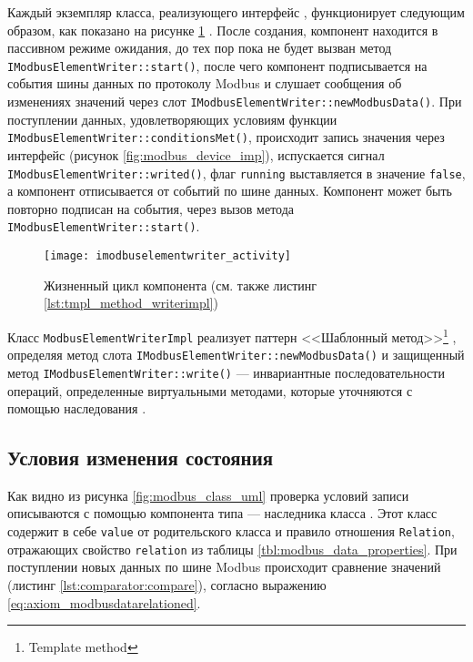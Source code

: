 Каждый экземпляр класса, реализующего интерфейс \mbwriter,
функционирует следующим образом, как показано на рисунке \ref{fig:imodbuselementwriter_activity} \cite[стр. 217]{book:oop:oop_analize}.
После создания, компонент находится в пассивном режиме ожидания, до тех пор пока не будет вызван
метод \texttt{IModbusElementWriter::start()}, после чего компонент подписывается на события шины данных по протоколу Modbus
и слушает сообщения об изменениях значений через слот \texttt{IModbusElementWriter::newModbusData()}.
При поступлении данных, удовлетворяющих условиям функции \texttt{IModbusElementWri\-ter::con\-di\-tions\-Met()},
происходит запись значения через интерфейс \mbdevice (рисунок \ref{fig:modbus_device_imp}),
испускается сигнал \texttt{IModbus\-Ele\-ment\-Writer::writed()},
флаг \texttt{running} выставляется в значение \texttt{false},
а компонент отписывается от событий по шине данных.
Компонент может быть повторно подписан на события, через вызов метода \texttt{IModbusElementWriter::start()}.

\begin{center}
    \begin{figure}
        \texttt{[image: imodbuselementwriter\_activity]}
        \caption[Жизненный цикл компонента \mbwriter]%
            {Жизненный цикл компонента \mbwriter%
                (см. также листинг \ref{lst:tmpl_method_writerimpl})%
            }%
            \label{fig:imodbuselementwriter_activity}
    \end{figure}
\end{center}


Класс \texttt{ModbusElementWriterImpl} реализует паттерн <<Шаблонный метод>>\footnote{Template method} \cite[стр. 309]{book:pattern:band_of_4},
определяя метод слота \texttt{IModbusElement\-Writer::new\-Modbus\-Data()}
и защищенный метод \texttt{IModbus\-Element\-Writer::wri\-te()} --- инвариантные последовательности операций,
определенные виртуальными методами, которые уточняются с помощью наследования \cite[стр. 170]{book:tdd:KentBeck}.




\subsection{Условия изменения состояния}
Как видно из рисунка \ref{fig:modbus_class_uml} проверка условий записи описываются с помощью компонента типа
\mbrelationed --- наследника класса \mbdata.
Этот класс содержит в себе \texttt{value} от родительского класса и правило отношения \texttt{Relation},
отражающих свойство \texttt{relation} из таблицы \ref{tbl:modbus_data_properties}.
При поступлении новых данных по шине Modbus происходит сравнение значений (листинг \ref{lst:comparator:compare}),
согласно выражению \eqref{eq:axiom_modbusdatarelationed}.



